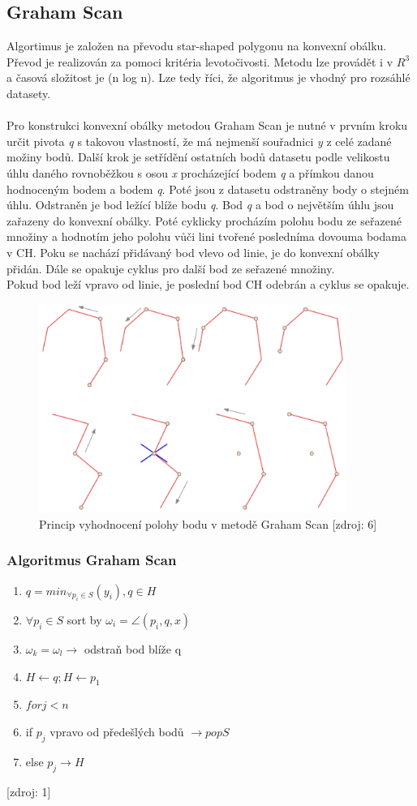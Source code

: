 \documentclass[a4paper, 12pt]{article}
\begin{document}
\subsection{Graham Scan}
Algortimus je založen na převodu star-shaped polygonu na konvexní obálku. Převod je realizován za pomoci kritéria levotočivosti. Metodu lze provádět i v $R^3$ a časová složitost je (n log n). Lze tedy říci, že algoritmus je vhodný pro rozsáhlé datasety.\\
\\
Pro konstrukci konvexní obálky metodou Graham Scan je nutné v prvním kroku určit pivota \textit{q} s takovou vlastností, že má nejmenší souřadnici \textit{y} z celé zadané možiny bodů. Další krok je setřídění ostatních bodů datasetu podle velikostu úhlu daného rovnoběžkou s osou \textit{x} procházející bodem \textit{q} a přímkou danou hodnoceným bodem a bodem \textit{q}. Poté jsou z datasetu odstraněny body o stejném úhlu. Odstraněn je bod ležící blíže bodu \textit{q}. Bod \textit{q} a bod o největším úhlu jsou zařazeny do konvexní obálky. Poté cyklicky procházím polohu bodu ze seřazené množiny a hodnotím jeho polohu vůči lini tvořené posledníma dovouma bodama v CH. Poku se nachází přidávaný bod vlevo od linie, je do konvexní obálky přidán. Dále se opakuje cyklus pro další bod ze seřazené množiny. \\
Pokud bod leží vpravo od linie, je poslední bod CH odebrán a cyklus se opakuje. 

\begin{figure}[h!]
	\centering
	\includegraphics[width=10cm]{graham_scan.jpg}
	\caption{Princip vyhodnocení polohy bodu v metodě Graham Scan [zdroj: 6]}
\end{figure}

\subsubsection{Algoritmus Graham Scan}
\begin{enumerate}
\item $ q = min_{\forall p_i \in S} (y_i), q \in H $ 
\item $ {\forall p_i \in S}$ sort by $ \omega_i = \angle (p_i, q, x)$
\item $ \omega_k = \omega_l \rightarrow $ odstraň bod blíže q 
\item $ H \leftarrow q; H \leftarrow p_1$
\item $ for j < n $
\item if $ p_j $ vpravo od předešlých bodů $ \rightarrow pop S$
\item else $ p_{j}  \rightarrow H $
\end{enumerate}
[zdroj: 1]
\end{document}

